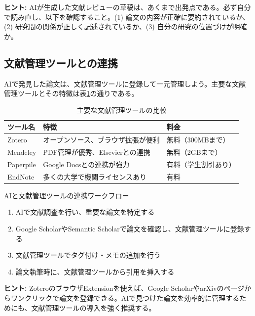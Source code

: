 \begin{screen}
\textbf{ヒント:} AIが生成した文献レビューの草稿は、あくまで出発点である。必ず自分で読み直し、以下を確認すること。(1) 論文の内容が正確に要約されているか、(2) 研究間の関係が正しく記述されているか、(3) 自分の研究の位置づけが明確か。
\end{screen}

\subsection{文献管理ツールとの連携}

AIで発見した論文は、文献管理ツールに登録して一元管理しよう。主要な文献管理ツールとその特徴は表\ref{tab:reference_tools}の通りである。

\begin{table}[htbp]
\centering
\caption{主要な文献管理ツールの比較}
\label{tab:reference_tools}
\begin{tabular}{lll}
\toprule
ツール名 & 特徴 & 料金 \\
\midrule
Zotero\index{Zotero} & オープンソース、ブラウザ拡張が便利 & 無料（300MBまで） \\
Mendeley\index{Mendeley} & PDF管理が優秀、Elsevierとの連携 & 無料（2GBまで） \\
Paperpile & Google Docsとの連携が強力 & 有料（学生割引あり） \\
EndNote\index{EndNote} & 多くの大学で機関ライセンスあり & 有料 \\
\bottomrule
\end{tabular}
\end{table}

\begin{itembox}[l]{AIと文献管理ツールの連携ワークフロー}
\begin{enumerate}
\item AIで文献調査を行い、重要な論文を特定する
\item Google ScholarやSemantic Scholarで論文を確認し、文献管理ツールに登録する
\item 文献管理ツールでタグ付け・メモの追加を行う
\item 論文執筆時に、文献管理ツールから引用を挿入する
\end{enumerate}
\end{itembox}

\begin{screen}
\textbf{ヒント:} ZoteroのブラウザExtensionを使えば、Google ScholarやarXivのページからワンクリックで論文を登録できる。AIで見つけた論文を効率的に管理するためにも、文献管理ツールの導入を強く推奨する。
\end{screen}

